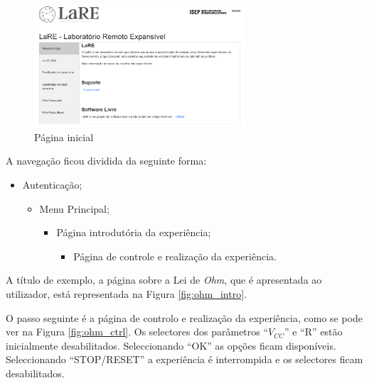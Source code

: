 \begin{figure}[hbtp]
	\centering
	\includegraphics[width=0.7\textwidth]{figures/menupage.png}
	\caption{Página inicial}
	\label{fig:pagmenu}
\end{figure}

A navegação ficou dividida da seguinte forma:
\begin{itemize}
	\item Autenticação;
	\begin{itemize}
		\item Menu Principal;
		\begin{itemize}
			\item Página introdutória da experiência;
			\begin{itemize}
				\item Página de controle e realização da experiência.
			\end{itemize}
		\end{itemize}
	\end{itemize}
\end{itemize}

A título de exemplo, a página sobre a Lei de \textit{Ohm}, que é apresentada ao utilizador, está representada na Figura \ref{fig:ohm_intro}.

O passo seguinte é a página de controlo e realização da experiência, como se pode ver na Figura \ref{fig:ohm_ctrl}. Os selectores dos parâmetros ``$V_{CC}$'' e ``R'' estão inicialmente desabilitados. Seleccionando ``OK'' as opções ficam disponíveis. Seleccionando ``STOP/RESET'' a experiência é interrompida e os selectores ficam desabilitados.

